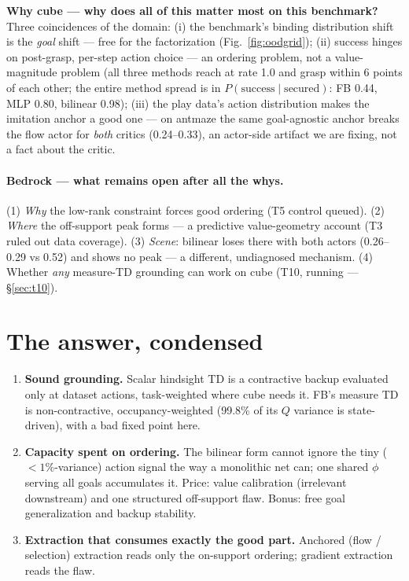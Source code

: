 \documentclass[11pt]{article}
\newcommand{\whyq}[1]{\medskip\noindent\textbf{\textcolor{blue!50!black}{Why #1}}\\}
\begin{document}
\whyq{cube --- why does all of this matter most on this benchmark?}
Three coincidences of the domain: (i) the benchmark's binding distribution shift is the
\emph{goal} shift --- free for the factorization (Fig.~\ref{fig:oodgrid}); (ii) success hinges
on post-grasp, per-step action choice --- an ordering problem, not a value-magnitude problem
(all three methods reach at rate 1.0 and grasp within 6 points of each other; the entire
method spread is in $P(\mathrm{success}\mid\mathrm{secured})$: FB 0.44, MLP 0.80, bilinear
0.98); (iii) the play data's action distribution makes the imitation anchor a good one --- on
antmaze the same goal-agnostic anchor breaks the flow actor for \emph{both} critics
(0.24--0.33), an actor-side artifact we are fixing, not a fact about the critic.

\paragraph{Bedrock --- what remains open after all the whys.}
(1) \emph{Why} the low-rank constraint forces good ordering (T5 control queued).
(2) \emph{Where} the off-support peak forms --- a predictive value-geometry account (T3 ruled
out data coverage). (3) \emph{Scene}: bilinear loses there with both actors (0.26--0.29 vs
0.52) and shows no peak --- a different, undiagnosed mechanism. (4) Whether \emph{any}
measure-TD grounding can work on cube (T10, running --- \S\ref{sec:t10}).

\section{The answer, condensed}

\begin{enumerate}[leftmargin=1.6em]
\item \textbf{Sound grounding.} Scalar hindsight TD is a contractive backup evaluated only at
dataset actions, task-weighted where cube needs it. FB's measure TD is non-contractive,
occupancy-weighted (99.8\% of its $Q$ variance is state-driven), with a bad fixed point here.
\item \textbf{Capacity spent on ordering.} The bilinear form cannot ignore the tiny
($<1\%$-variance) action signal the way a monolithic net can; one shared $\phi$ serving all
goals accumulates it. Price: value calibration (irrelevant downstream) and one structured
off-support flaw. Bonus: free goal generalization and backup stability.
\item \textbf{Extraction that consumes exactly the good part.} Anchored (flow / selection)
extraction reads only the on-support ordering; gradient extraction reads the flaw.
\end{enumerate}
\end{document}
